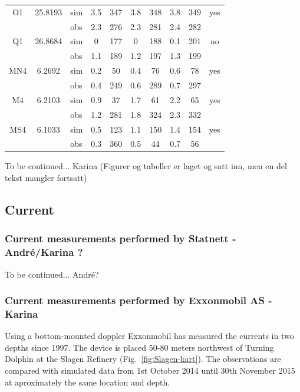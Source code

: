 \documentclass[12pt,a4paper,english]{article}
\begin{document}
\begin{table}[ht]
\begin{tabular}{|c|c|l|cc|cc|cc|c|}
\small O1   & 25.8193 & sim & 3.5 & 347 & 3.8 & 348 & 3.8 & 349 & yes  \\
\small      &        & obs & 2.3 & 276 & 2.3 & 281 & 2.4 & 282 &    \\
\small Q1   & 26.8684 & sim & 0 & 177 & 0 & 188 & 0.1 & 201 & no   \\
\small      &        & obs & 1.1 & 189 & 1.2 & 197 & 1.3 & 199 &    \\
\small MN4  & 6.2692 & sim & 0.2 & 50 & 0.4 & 76 & 0.6 & 78 & yes  \\
\small      &        & obs & 0.4 & 249 & 0.6 & 289 & 0.7 & 297 &    \\
\small M4   & 6.2103 & sim & 0.9 & 37 & 1.7 & 61 & 2.2 & 65 & yes  \\
\small      &        & obs & 1.2 & 281 & 1.8 & 324 & 2.3 & 332 &    \\
\small MS4  & 6.1033 & sim & 0.5 & 123 & 1.1 & 150 & 1.4 & 154 & yes  \\
\small      &        & obs & 0.3 & 360 & 0.5 & 44 & 0.7 & 56 &    \\
\hline
\end{tabular}
\end{table}


 



To be continued... Karina (Figurer og tabeller er laget og satt inn, men en del tekst mangler fortsatt)


\clearpage 
\subsection{Current}

\subsubsection{Current measurements performed by Statnett - Andr\'{e}/Karina ?}
To be continued... Andr\'{e}?

\subsubsection{Current measurements performed by Exxonmobil AS - Karina}
Using a bottom-mounted doppler Exxonmobil has measured the currents in two depths since 1997. The device is placed 50-80 meters northwest of Turning Dolphin at the Slagen Refinery (Fig.~\ref{fig:Slagen-kart}). The observations are compared with simulated data from 1st October 2014 until 30th November 2015 at aproximately the same location and depth.
\end{document}
